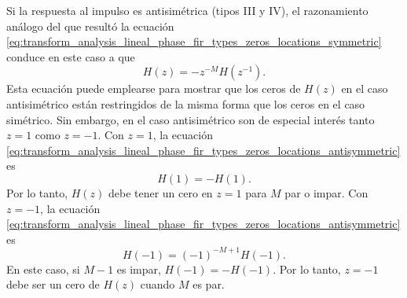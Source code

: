 \documentclass[a4paper]{report}
\begin{document}
Si la respuesta al impulso es antisimétrica (tipos III y IV), el razonamiento análogo del que resultó la ecuación \ref{eq:transform_analysis_lineal_phase_fir_types_zeros_locations_symmetric} conduce en este caso a que 
\begin{equation}\label{eq:transform_analysis_lineal_phase_fir_types_zeros_locations_antisymmetric}
 H(z)=-z^{-M}H(z^{-1}). 
\end{equation}
Esta ecuación puede emplearse para mostrar que los ceros de \(H(z)\) en el caso antisimétrico están restringidos de la misma forma que los ceros en el caso simétrico. Sin embargo, en el caso antisimétrico son de especial interés tanto \(z=1\) como \(z=-1\). Con \(z=1\), la ecuación \ref{eq:transform_analysis_lineal_phase_fir_types_zeros_locations_antisymmetric} es
\[
 H(1)=-H(1).
\]
Por lo tanto, \(H(z)\) debe tener un cero en \(z=1\) para \(M\) par o impar. Con \(z=-1\), la ecuación \ref{eq:transform_analysis_lineal_phase_fir_types_zeros_locations_antisymmetric} es
\[
 H(-1)=(-1)^{-M+1}H(-1).
\]
En este caso, si \(M-1\) es impar, \(H(-1)=-H(-1)\). Por lo tanto, \(z=-1\) debe ser un cero de \(H(z)\) cuando \(M\) es par.
\end{document}
